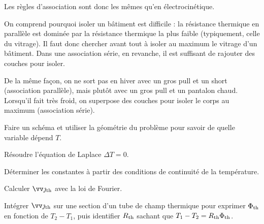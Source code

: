 \documentclass[12pt,fancy]{cours}
\begin{document}
Les règles d’association sont donc les mêmes qu’en électrocinétique.


\begin{remarque}
On comprend pourquoi isoler un bâtiment est difficile : la résistance thermique en parallèle est dominée par la résistance thermique la plus faible (typiquement, celle du vitrage). Il faut donc chercher avant tout à isoler au maximum le vitrage d’un bâtiment. Dans une association série, en revanche, il est suffisant de rajouter des couches pour isoler.

De la même façon, on ne sort pas en hiver avec un gros pull et un short (association parallèle), mais plutôt avec un gros pull et un pantalon chaud. Lorsqu'il fait très froid, on superpose des couches pour isoler le corps au maximum (association série).
\end{remarque}

\begin{methode}
  \item Faire un schéma et utiliser la géométrie du problème pour savoir de quelle variable dépend $T$.
  \item Résoudre l'équation de Laplace $\Delta T = 0$.
  \item Déterminer les constantes à partir des conditions de continuité de la température.
  \item Calculer $\Vec{\jth}$ avec la loi de Fourier.
  \item Intégrer $\Vec{\jth}$ sur une section d'un tube de champ thermique pour exprimer ${\Phi_{\rm th}}$ en fonction de $T_2-T_1$, puis identifier $R_{\rm th}$ sachant que $T_1-T_2 =  R_{\rm th} {\Phi_{\rm th}}$.
\end{methode}
\end{document}
